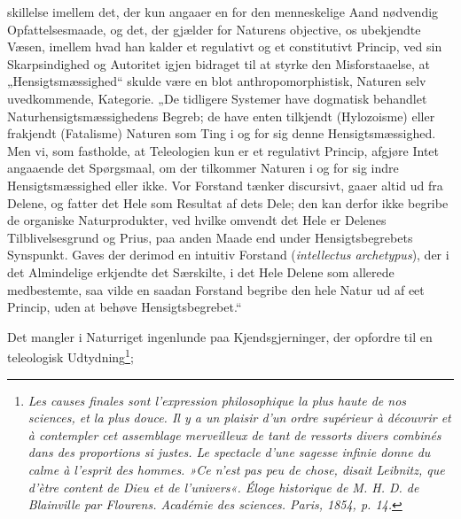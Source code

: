 \documentclass[12pt,a4paper]{book}
\begin{document}
\setcounter{footnote}{0}
skillelse imellem det, der kun angaaer en for den menneskelige Aand
nødvendig Opfattelsesmaade, og det, der gjælder for Naturens objective, os
ubekjendte Væsen, imellem hvad han kalder et regulativt og et constitutivt
Princip, ved sin Skarpsindighed og Autoritet igjen bidraget til at styrke
den Misforstaaelse, at „Hensigtsmæssighed“ skulde være en blot
anthropomorphistisk, Naturen selv uvedkommende, Kategorie. „De tidligere
Systemer have dogmatisk behandlet Naturhensigtsmæssighedens Begreb; de
have enten tilkjendt (Hylozoisme) eller frakjendt (Fatalisme) Naturen som
Ting i og for sig denne Hensigtsmæssighed. Men vi, som fastholde, at
Teleologien kun er et regulativt Princip, afgjøre Intet angaaende det
Spørgsmaal, om der tilkommer Naturen i og for sig indre Hensigtsmæssighed
eller ikke. Vor Forstand tænker discursivt, gaaer altid ud fra Delene, og
fatter det Hele som Resultat af dets Dele; den kan derfor ikke begribe de
organiske Naturprodukter, ved hvilke omvendt det Hele er Delenes
Tilblivelsesgrund og Prius, paa anden Maade end under Hensigtsbegrebets
Synspunkt. Gaves der derimod en intuitiv Forstand
(\textit{intellectus archetypus}), der i det Almindelige erkjendte det
Særskilte, i det Hele Delene som allerede medbestemte, saa vilde en saadan
Forstand begribe den hele Natur ud af eet Princip, uden at behøve
Hensigtsbegrebet.“

Det mangler i Naturriget ingenlunde paa Kjendsgjerninger, der opfordre til
en teleologisk Udtydning\footnote{\textit{Les \emph{causes finales} sont
l'expression philosophique la plus haute de nos sciences, et la plus
douce. Il y a un plaisir d'un ordre supérieur à découvrir et à contempler
cet assemblage merveilleux de tant de ressorts divers combinés dans des
proportions si justes. Le spectacle d'une sagesse infinie donne du calme à
l'esprit des hommes. »Ce n'est pas peu de chose, disait Leibnitz, que
d'ètre content de Dieu et de l'univers«. Éloge historique de M. H. D. de
Blainville par Flourens. Académie des sciences. Paris, 1854, p. 14.}};
\end{document}
